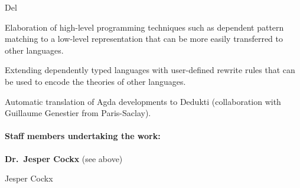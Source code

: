 \begin{sitedescription}{Del}
\begin{compactitem}
\item Elaboration of high-level programming techniques such as
  dependent pattern matching to a low-level representation that can be
  more easily transferred to other languages.
\item Extending dependently typed languages with user-defined rewrite
  rules that can be used to encode the theories of other languages.
\item Automatic translation of Agda developments to Dedukti
  (collaboration with Guillaume Genestier from Paris-Saclay).
\end{compactitem}

\paragraph{Staff members undertaking the work:}

\textbf{Dr.\ Jesper Cockx} (see above)

Jesper Cockx


\end{sitedescription}

